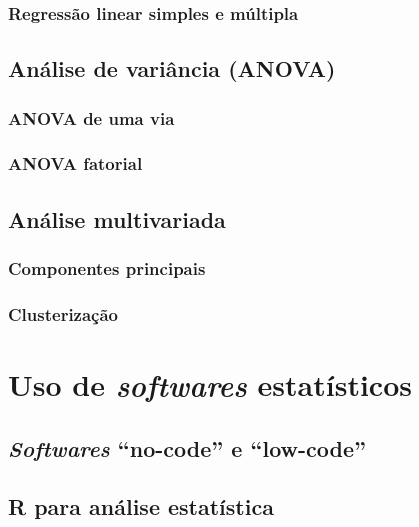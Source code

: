 \documentclass[
]{book}
\begin{document}
\subsection{Regressão linear simples e múltipla}\label{regressuxe3o-linear-simples-e-muxfaltipla}

\section{Análise de variância (ANOVA)}\label{anuxe1lise-de-variuxe2ncia-anova}

\subsection{ANOVA de uma via}\label{anova-de-uma-via}

\subsection{ANOVA fatorial}\label{anova-fatorial}

\section{Análise multivariada}\label{anuxe1lise-multivariada}

\subsection{Componentes principais}\label{componentes-principais}

\subsection{Clusterização}\label{clusterizauxe7uxe3o}

\chapter{\texorpdfstring{Uso de \emph{softwares} estatísticos}{Uso de softwares estatísticos}}\label{uso-de-softwares-estatuxedsticos}

\section{\texorpdfstring{\emph{Softwares} ``no-code'' e ``low-code''}{Softwares ``no-code'' e ``low-code''}}\label{softwares-no-code-e-low-code}

\section{R para análise estatística}\label{r-para-anuxe1lise-estatuxedstica}
\end{document}
